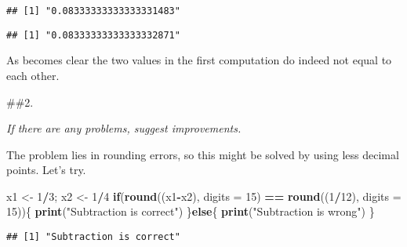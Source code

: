 \documentclass[]{article}
\newenvironment{Shaded}{\begin{snugshade}}{\end{snugshade}}
\newcommand{\ControlFlowTok}[1]{\textcolor[rgb]{0.13,0.29,0.53}{\textbf{#1}}}
\newcommand{\DataTypeTok}[1]{\textcolor[rgb]{0.13,0.29,0.53}{#1}}
\newcommand{\DecValTok}[1]{\textcolor[rgb]{0.00,0.00,0.81}{#1}}
\newcommand{\KeywordTok}[1]{\textcolor[rgb]{0.13,0.29,0.53}{\textbf{#1}}}
\newcommand{\NormalTok}[1]{#1}
\newcommand{\OperatorTok}[1]{\textcolor[rgb]{0.81,0.36,0.00}{\textbf{#1}}}
\newcommand{\StringTok}[1]{\textcolor[rgb]{0.31,0.60,0.02}{#1}}
\begin{document}
\begin{Shaded}
\end{Shaded}

\begin{verbatim}
## [1] "0.08333333333333331483"
\end{verbatim}

\begin{Shaded}
\end{Shaded}

\begin{verbatim}
## [1] "0.08333333333333332871"
\end{verbatim}

As becomes clear the two values in the first computation do indeed not
equal to each other.

\#\#2.

\emph{If there are any problems, suggest improvements.}

The problem lies in rounding errors, so this might be solved by using
less decimal points. Let's try.

\begin{Shaded}
\begin{Highlighting}[]
\NormalTok{x1 <-}\StringTok{ }\DecValTok{1}\OperatorTok{/}\DecValTok{3}\NormalTok{; x2 <-}\StringTok{ }\DecValTok{1}\OperatorTok{/}\DecValTok{4}
\ControlFlowTok{if}\NormalTok{(}\KeywordTok{round}\NormalTok{((x1}\OperatorTok{-}\NormalTok{x2), }\DataTypeTok{digits =} \DecValTok{15}\NormalTok{) }\OperatorTok{==}\StringTok{ }\KeywordTok{round}\NormalTok{((}\DecValTok{1}\OperatorTok{/}\DecValTok{12}\NormalTok{), }\DataTypeTok{digits =} \DecValTok{15}\NormalTok{))\{}
  \KeywordTok{print}\NormalTok{(}\StringTok{"Subtraction is correct"}\NormalTok{)}
\NormalTok{\}}\ControlFlowTok{else}\NormalTok{\{}
  \KeywordTok{print}\NormalTok{(}\StringTok{"Subtraction is wrong"}\NormalTok{)}
\NormalTok{\}}
\end{Highlighting}
\end{Shaded}

\begin{verbatim}
## [1] "Subtraction is correct"
\end{verbatim}
\end{document}
